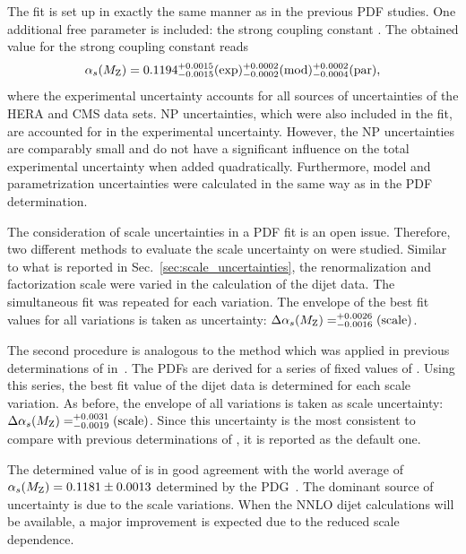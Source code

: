 The fit is set up in exactly the same manner as
in the previous PDF studies. One additional free parameter is included: the
strong coupling constant \asmz. The obtained value for the strong coupling constant
reads
%
\begin{equation*}
  \alpha_{s}(M_\mathrm{Z}) = 0.1194_{-0.0015}^{+0.0015}(\mathrm{exp})_{-0.0002}^{+0.0002}(\mathrm{mod})_{-0.0004}^{+0.0002}(\mathrm{par}),
\end{equation*}
%
where the experimental uncertainty accounts for all sources of uncertainties of
the HERA and CMS data sets. NP uncertainties, which were also included in the
fit, are accounted for in the experimental uncertainty. However, the NP
uncertainties are comparably small and do not have a significant influence on the total
experimental uncertainty when added quadratically. Furthermore, model and parametrization uncertainties
were calculated in the same way as in the PDF determination. 

The consideration of scale uncertainties in a PDF fit is an open issue.
Therefore, two different methods to evaluate the scale uncertainty on \asmz were
studied. Similar to what is reported in Sec.~\ref{sec:scale_uncertainties}, the
renormalization and factorization scale were varied in the calculation of the
dijet data. The simultaneous fit was repeated for each variation. The envelope
of the best fit \asmz values for all variations is taken as uncertainty:
$\Delta\alpha_{s}(M_\mathrm{Z})= _{-0.0016}^{+0.0026}(\mathrm{scale})$.

The second procedure is analogous to the method which was applied in previous
determinations of \asmz \eg in~\cite{CMS:2014mna,Khachatryan:2014waa}. The PDFs
are derived for a series of fixed values of \asmz. Using this series, the best
fit \asmz value of the dijet data is determined for each scale variation. As
before, the envelope of all variations is taken as scale uncertainty: $\Delta
\alpha_{s}(M_\mathrm{Z}) = _{-0.0019}^{+0.0031}(\mathrm{scale})$. Since this uncertainty is the
most consistent to compare with previous determinations of \asmz, it is reported
as the default one. 

The determined value of \asmz is in good agreement with the world average of
$\alpha_{s}(M_\mathrm{Z})=0.1181\pm 0.0013$ determined by the PDG~\cite{Agashe:2014kda}. The
dominant source of uncertainty is due to the scale variations. When the NNLO
dijet calculations will be available, a major improvement is expected due to the
reduced scale dependence.
